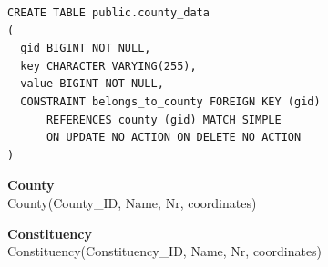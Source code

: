 \begin{lstlisting}
CREATE TABLE public.county_data
(
  gid BIGINT NOT NULL,
  key CHARACTER VARYING(255),
  value BIGINT NOT NULL,
  CONSTRAINT belongs_to_county FOREIGN KEY (gid)
      REFERENCES county (gid) MATCH SIMPLE
      ON UPDATE NO ACTION ON DELETE NO ACTION
)
\end{lstlisting}

\textbf{County}
\\County(County\_ID, Name, Nr, coordinates)

\textbf{Constituency}
\\Constituency(Constituency\_ID, Name, Nr,
coordinates)